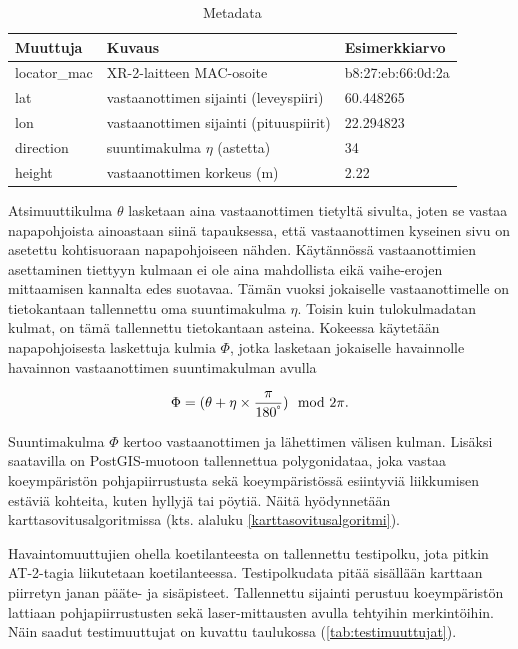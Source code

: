 \documentclass[
  12pt,
  a4paper, twoside]{book}
\begin{document}
\def\arraystretch{1.25} 
\begin{table}[H]
\centering
\begin{tabular}{|l|l|l|}
\hline
Muuttuja & Kuvaus & Esimerkkiarvo\\
\hline
locator\_mac & XR-2-laitteen MAC-osoite & b8:27:eb:66:0d:2a\\
lat & vastaanottimen sijainti (leveyspiiri) & 60.448265\\
lon & vastaanottimen sijainti (pituuspiirit) & 22.294823\\
direction & suuntimakulma $\eta$ (astetta) & 34\\
height & vastaanottimen korkeus (m) & 2.22 \\
\hline
\end{tabular}
\caption{Metadata}
\label{tab:metadata}
\end{table}

Atsimuuttikulma \(\theta\) lasketaan aina vastaanottimen tietyltä sivulta, joten se vastaa napapohjoista ainoastaan siinä tapauksessa, että vastaanottimen kyseinen sivu on asetettu kohtisuoraan napapohjoiseen nähden. Käytännössä vastaanottimien asettaminen tiettyyn kulmaan ei ole aina mahdollista eikä vaihe-erojen mittaamisen kannalta edes suotavaa. Tämän vuoksi jokaiselle vastaanottimelle on tietokantaan tallennettu oma suuntimakulma \(\eta\). Toisin kuin tulokulmadatan kulmat, on tämä tallennettu tietokantaan asteina. Kokeessa käytetään napapohjoisesta laskettuja kulmia \(\Phi\), jotka lasketaan jokaiselle havainnolle havainnon vastaanottimen suuntimakulman avulla

\begin{align}
\Phi=(\theta + \eta \times \frac{\pi}{180^\degree}) \mod 2 \pi.
\end{align}

Suuntimakulma \(\Phi\) kertoo vastaanottimen ja lähettimen välisen kulman. Lisäksi saatavilla on PostGIS-muotoon tallennettua polygonidataa, joka vastaa koeympäristön pohjapiirrustusta sekä koeympäristössä esiintyviä liikkumisen estäviä kohteita, kuten hyllyjä tai pöytiä. Näitä hyödynnetään karttasovitusalgoritmissa (kts. alaluku \ref{karttasovitusalgoritmi}).

Havaintomuuttujien ohella koetilanteesta on tallennettu testipolku, jota pitkin AT-2-tagia liikutetaan koetilanteessa. Testipolkudata pitää sisällään karttaan piirretyn janan pääte- ja sisäpisteet. Tallennettu sijainti perustuu koeympäristön lattiaan pohjapiirrustusten sekä laser-mittausten avulla tehtyihin merkintöihin. Näin saadut testimuuttujat on kuvattu taulukossa (\ref{tab:testimuuttujat}).
\end{document}
